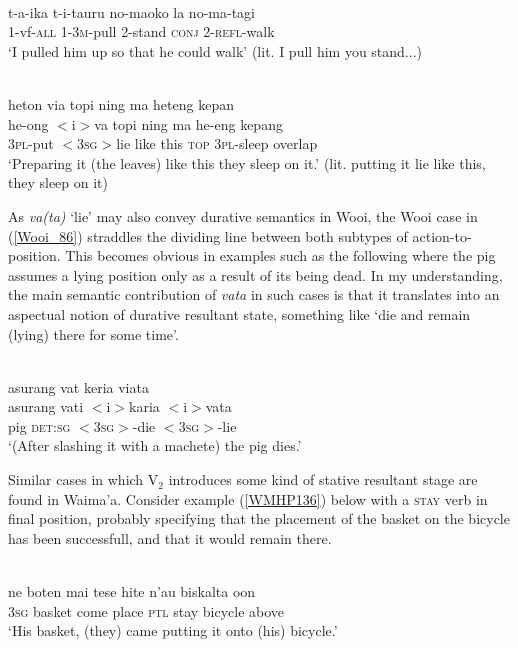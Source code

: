 \ea \label{Tobelo_20}
\\
\gll t-a-ika t-i-tauru no-maoko la no-ma-tagi \\
1-vf-\textsc{all} 1-3\textsc{m}-pull 2-stand \textsc{conj} 2-\textsc{refl}-walk \\
\glft `I pulled him up so that he could walk' (lit. I pull him you stand...)\\ 
\z

\ea \label{Wooi_86}
\\
\glll heton via topi ning ma heteng kepan \\
he-ong $<$i$>$va topi ning ma he-eng kepang \\
3\textsc{pl}-put $<$3\textsc{sg}$>$lie like this \textsc{top} 3\textsc{pl}-sleep overlap \\
\glft `Preparing it (the leaves) like this they sleep on it.' (lit. putting it lie like this, they sleep on it) \\ 
\z

As \textit{va(ta)} `lie' may also convey durative semantics in Wooi, the Wooi case in (\ref{Wooi_86}) straddles the dividing line between both subtypes of action-to-position. This becomes obvious in examples such as the following where the pig assumes a lying position only as a result of its being dead. In my understanding, the main semantic contribution of \textit{vata} in such cases is that it translates into an aspectual notion of durative resultant state, something like `die and remain (lying) there for some time'.

\ea 
{}\\
\glll asurang vat keria viata \\
asurang vati $<$i$>$karia $<$i$>$vata \\
pig \textsc{det}:\textsc{sg} $<$3\textsc{sg}$>$-die $<$3\textsc{sg}$>$-lie \\
\glft `(After slashing it with a machete) the pig dies.'\\ 
\z

Similar cases in which V$_2$ introduces some kind of stative resultant stage are found in Waima'a. Consider example (\ref{WMHP136}) below with a \textsc{stay} verb in final position, probably specifying that the placement of the basket on the bicycle has been successfull, and that it would remain there.

\ea \label{WMHP136}
\\
\gll ne boten mai tese hite n'au biskalta oon \\
\textsc{3}\textsc{sg} basket come place \textsc{ptl} stay bicycle above \\
\glft `His basket, (they) came putting it onto (his) bicycle.' \\ 
\z

